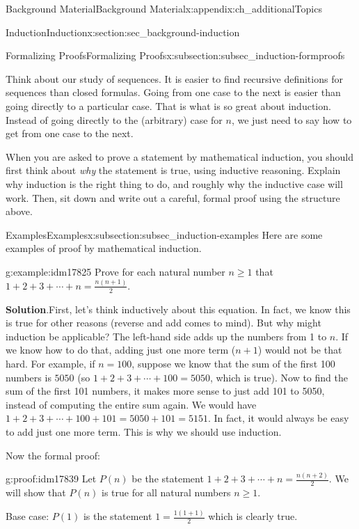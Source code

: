 \documentclass[oneside,10pt,]{book}
\numberwithin{equation}{chapter}
\begin{document}
\begin{appendixptx}{Background Material}{}{Background Material}{}{}{x:appendix:ch_additionalTopics}
\begin{sectionptx}{Induction}{}{Induction}{}{}{x:section:sec_background-induction}
\begin{subsectionptx}{Formalizing Proofs}{}{Formalizing Proofs}{}{}{x:subsection:subsec_induction-formproofs}
\par
Think about our study of sequences. It is easier to find recursive definitions for sequences than closed formulas. Going from one case to the next is easier than going directly to a particular case. That is what is so great about induction. Instead of going directly to the (arbitrary) case for \(n\), we just need to say how to get from one case to the next.%
\par
When you are asked to prove a statement by mathematical induction, you should first think about \emph{why} the statement is true, using inductive reasoning. Explain why induction is the right thing to do, and roughly why the inductive case will work. Then, sit down and write out a careful, formal proof using the structure above.%
\end{subsectionptx}
%
%
\typeout{************************************************}
\typeout{************************************************}
%
\begin{subsectionptx}{Examples}{}{Examples}{}{}{x:subsection:subsec_induction-examples}
Here are some examples of proof by mathematical induction.%
\begin{example}{}{g:example:idm17825}%
Prove for each natural number \(n \ge 1\) that \(1 + 2 + 3 + \cdots + n = \frac{n(n+1)}{2}\).%
\par\smallskip%
\noindent\textbf{Solution}.\hypertarget{g:solution:idm17830}{}\quad{}First, let's think inductively about this equation. In fact, we know this is true for other reasons (reverse and add comes to mind). But why might induction be applicable? The left-hand side adds up the numbers from 1 to \(n\). If we know how to do that, adding just one more term (\(n+1\)) would not be that hard. For example, if \(n = 100\), suppose we know that the sum of the first 100 numbers is \(5050\) (so \(1 + 2 + 3 + \cdots + 100 = 5050\), which is true). Now to find the sum of the first 101 numbers, it makes more sense to just add 101 to 5050, instead of computing the entire sum again. We would have \(1 + 2 + 3 + \cdots + 100 + 101 = 5050 + 101 = 5151\). In fact, it would always be easy to add just one more term. This is why we should use induction.%
\par
Now the formal proof:%
\begin{proofptx}{}{g:proof:idm17839}
Let \(P(n)\) be the statement \(1 + 2 + 3 + \cdots + n = \frac{n(n+2)}{2}\). We will show that \(P(n)\) is true for all natural numbers \(n \ge 1\).%
\par
Base case: \(P(1)\) is the statement \(1 = \frac{1(1+1)}{2}\) which is clearly true.%

\end{proofptx}
\end{example}
\end{subsectionptx}
\end{sectionptx}
\end{appendixptx}
\end{document}
